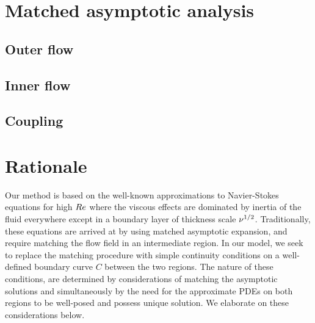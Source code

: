 



\section{Matched asymptotic analysis}

\subsection{Outer flow}
\subsection{Inner flow}
\subsection{Coupling}


\section{Rationale}

Our method is based on the well-known approximations to Navier-Stokes equations for high $Re$ where the viscous effects are dominated by inertia of the fluid everywhere except in a boundary layer of thickness scale $\nu^{1/2}$. 
Traditionally, these equations are arrived at by using matched asymptotic expansion, and require matching the flow field in an intermediate region.
In our model, we seek to replace the matching procedure with simple continuity conditions on a well-defined boundary curve $C$ between the two regions.
The nature of these conditions, are determined by considerations of matching the asymptotic solutions and simultaneously by the need for the approximate PDEs on both regions to be well-posed and possess unique solution.
We elaborate on these considerations below.

